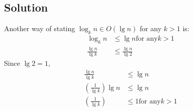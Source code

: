 \subsection*{Solution}
Another way of stating $\log_k n \in O(\lg n)$ for any $k > 1$ is:
\begin{align*}
\log_k n &\leq \lg n \text{for any}  k > 1 \\
\frac{\lg n}{\lg k} &\leq \frac{\lg n}{\lg 2}
\end{align*}
Since $\lg 2 = 1$, \\
\begin{align*}
\frac{\lg n}{\lg k} &\leq \lg n \\ 
\left(\frac{1}{\lg k}\right)\lg n &\leq \lg n \\
\left(\frac{1}{\lg k}\right) &\leq 1 \text{for any} k > 1 \\
\end{align*}
